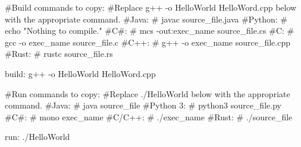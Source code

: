 #Build commands to copy:
#Replace g++ -o HelloWorld HelloWord.cpp below with the appropriate command.
#Java:
#	javac source_file.java
#Python:
#	echo "Nothing to compile."
#C#:
#	mcs -out:exec_name source_file.cs 
#C:
#	gcc -o exec_name source_file.c
#C++:
#	g++ -o exec_name source_file.cpp
#Rust:
#	rustc source_file.rs

build:
	g++ -o HelloWorld HelloWord.cpp

#Run commands to copy:
#Replace ./HelloWorld below with the appropriate command.
#Java:
#	java source_file
#Python 3:
#	python3 source_file.py
#C#:
#	mono exec_name
#C/C++:
#	./exec_name
#Rust:
#	./source_file

run:
	./HelloWorld 

